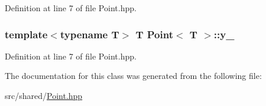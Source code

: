 Definition at line 7 of file Point.\-hpp.

\hypertarget{classPoint_a54b6f0a7faf44dd0263d57e332d266ad}{
\subsubsection[{y\-\_\-}]{\setlength{\rightskip}{0pt plus 5cm}template$<$typename T$>$ T {\bf Point}$<$ T $>$\-::y\-\_\-\hspace{0.3cm}{\ttfamily [private]}}}\label{classPoint_a54b6f0a7faf44dd0263d57e332d266ad}


Definition at line 7 of file Point.\-hpp.



The documentation for this class was generated from the following file\-:\begin{DoxyCompactItemize}
\item 
src/shared/\hyperlink{Point_8hpp}{Point.\-hpp}\end{DoxyCompactItemize}
